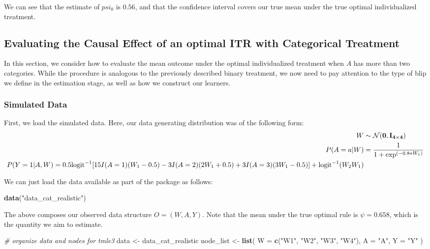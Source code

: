 \documentclass[12pt, krantz2,]{krantz}
\newenvironment{Shaded}{\begin{snugshade}}{\end{snugshade}}
\newcommand{\CommentTok}[1]{\textcolor[rgb]{0.37,0.37,0.37}{\textit{#1}}}
\newcommand{\DataTypeTok}[1]{\textcolor[rgb]{0.27,0.27,0.27}{#1}}
\newcommand{\KeywordTok}[1]{\textcolor[rgb]{0.27,0.27,0.27}{\textbf{#1}}}
\newcommand{\NormalTok}[1]{#1}
\newcommand{\StringTok}[1]{\textcolor[rgb]{0.5,0.5,0.5}{#1}}
\theoremstyle{definition}
\theoremstyle{definition}
\theoremstyle{definition}
\newcommand{\1}{\mathbbm{1}}
\begin{document}
We can see that the estimate of \(psi_0\) is \(0.56\), and that the confidence
interval covers our true mean under the true optimal individualized treatment.

\hypertarget{oit-eval-cat}{%
\subsection{Evaluating the Causal Effect of an optimal ITR with Categorical Treatment}\label{oit-eval-cat}}

In this section, we consider how to evaluate the mean outcome under the optimal
individualized treatment when \(A\) has more than two categories. While the
procedure is analogous to the previously described binary treatment, we now need
to pay attention to the type of blip we define in the estimation stage, as well
as how we construct our learners.

\hypertarget{simulated-data-1}{%
\subsubsection{Simulated Data}\label{simulated-data-1}}

First, we load the simulated data. Here, our data generating distribution was
of the following form:
\begin{align*}
  W &\sim \mathcal{N}(\bf{0},I_{4 \times 4})\\
  P(A=a|W) &= \frac{1}{1+\exp^{(-0.8*W_1)}}\\
  P(Y=1|A,W) = 0.5\text{logit}^{-1}[15I(A=1)(W_1-0.5) - 3I(A=2)(2W_1+0.5) +
    3I(A=3)(3W_1-0.5)] +\text{logit}^{-1}(W_2W_1)
\end{align*}

We can just load the data available as part of the package as follows:

\begin{Shaded}
\begin{Highlighting}[]
\KeywordTok{data}\NormalTok{(}\StringTok{"data_cat_realistic"}\NormalTok{)}
\end{Highlighting}
\end{Shaded}

The above composes our observed data structure \(O = (W, A, Y)\). Note that the
mean under the true optimal rule is \(\psi=0.658\), which is the quantity we aim
to estimate.

\begin{Shaded}
\begin{Highlighting}[]
\CommentTok{# organize data and nodes for tmle3}
\NormalTok{data <-}\StringTok{ }\NormalTok{data_cat_realistic}
\NormalTok{node_list <-}\StringTok{ }\KeywordTok{list}\NormalTok{(}
  \DataTypeTok{W =} \KeywordTok{c}\NormalTok{(}\StringTok{"W1"}\NormalTok{, }\StringTok{"W2"}\NormalTok{, }\StringTok{"W3"}\NormalTok{, }\StringTok{"W4"}\NormalTok{),}
  \DataTypeTok{A =} \StringTok{"A"}\NormalTok{,}
  \DataTypeTok{Y =} \StringTok{"Y"}
\NormalTok{)}
\end{Highlighting}
\end{Shaded}
\end{document}
